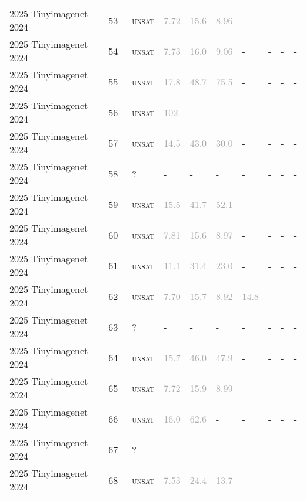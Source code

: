 \begin{center}
{\begin{longtable}{@{}llllllllll@{}}
2025 Tinyimagenet 2024 & 53 & ~\textsc{unsat} & \textcolor{darkgray}{7.72} & \textcolor{darkgray}{15.6} & \textcolor{darkgray}{8.96} & - & - & - & - \\
2025 Tinyimagenet 2024 & 54 & ~\textsc{unsat} & \textcolor{darkgray}{7.73} & \textcolor{darkgray}{16.0} & \textcolor{darkgray}{9.06} & - & - & - & - \\
2025 Tinyimagenet 2024 & 55 & ~\textsc{unsat} & \textcolor{darkgray}{17.8} & \textcolor{darkgray}{48.7} & \textcolor{darkgray}{75.5} & - & - & - & - \\
2025 Tinyimagenet 2024 & 56 & ~\textsc{unsat} & \textcolor{darkgray}{102} & - & - & - & - & - & - \\
2025 Tinyimagenet 2024 & 57 & ~\textsc{unsat} & \textcolor{darkgray}{14.5} & \textcolor{darkgray}{43.0} & \textcolor{darkgray}{30.0} & - & - & - & - \\
2025 Tinyimagenet 2024 & 58 & ~? & - & - & - & - & - & - & - \\
2025 Tinyimagenet 2024 & 59 & ~\textsc{unsat} & \textcolor{darkgray}{15.5} & \textcolor{darkgray}{41.7} & \textcolor{darkgray}{52.1} & - & - & - & - \\
2025 Tinyimagenet 2024 & 60 & ~\textsc{unsat} & \textcolor{darkgray}{7.81} & \textcolor{darkgray}{15.6} & \textcolor{darkgray}{8.97} & - & - & - & - \\
2025 Tinyimagenet 2024 & 61 & ~\textsc{unsat} & \textcolor{darkgray}{11.1} & \textcolor{darkgray}{31.4} & \textcolor{darkgray}{23.0} & - & - & - & - \\
2025 Tinyimagenet 2024 & 62 & ~\textsc{unsat} & \textcolor{darkgray}{7.70} & \textcolor{darkgray}{15.7} & \textcolor{darkgray}{8.92} & \textcolor{darkgray}{14.8} & - & - & - \\
2025 Tinyimagenet 2024 & 63 & ~? & - & - & - & - & - & - & - \\
2025 Tinyimagenet 2024 & 64 & ~\textsc{unsat} & \textcolor{darkgray}{15.7} & \textcolor{darkgray}{46.0} & \textcolor{darkgray}{47.9} & - & - & - & - \\
2025 Tinyimagenet 2024 & 65 & ~\textsc{unsat} & \textcolor{darkgray}{7.72} & \textcolor{darkgray}{15.9} & \textcolor{darkgray}{8.99} & - & - & - & - \\
2025 Tinyimagenet 2024 & 66 & ~\textsc{unsat} & \textcolor{darkgray}{16.0} & \textcolor{darkgray}{62.6} & - & - & - & - & - \\
2025 Tinyimagenet 2024 & 67 & ~? & - & - & - & - & - & - & - \\
2025 Tinyimagenet 2024 & 68 & ~\textsc{unsat} & \textcolor{darkgray}{7.53} & \textcolor{darkgray}{24.4} & \textcolor{darkgray}{13.7} & - & - & - & - \\

\end{longtable}}
\end{center}
